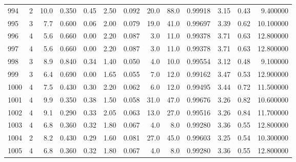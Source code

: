\begin{tabular}{lrrrrrrrrrrrr}
994  &        2 &           10.0 &             0.350 &         0.45 &            2.50 &      0.092 &                 20.0 &                  88.0 &  0.99918 &  3.15 &       0.43 &   9.400000 \\
995  &        3 &            7.7 &             0.600 &         0.06 &            2.00 &      0.079 &                 19.0 &                  41.0 &  0.99697 &  3.39 &       0.62 &  10.100000 \\
996  &        4 &            5.6 &             0.660 &         0.00 &            2.20 &      0.087 &                  3.0 &                  11.0 &  0.99378 &  3.71 &       0.63 &  12.800000 \\
997  &        4 &            5.6 &             0.660 &         0.00 &            2.20 &      0.087 &                  3.0 &                  11.0 &  0.99378 &  3.71 &       0.63 &  12.800000 \\
998  &        3 &            8.9 &             0.840 &         0.34 &            1.40 &      0.050 &                  4.0 &                  10.0 &  0.99554 &  3.12 &       0.48 &   9.100000 \\
999  &        3 &            6.4 &             0.690 &         0.00 &            1.65 &      0.055 &                  7.0 &                  12.0 &  0.99162 &  3.47 &       0.53 &  12.900000 \\
1000 &        4 &            7.5 &             0.430 &         0.30 &            2.20 &      0.062 &                  6.0 &                  12.0 &  0.99495 &  3.44 &       0.72 &  11.500000 \\
1001 &        4 &            9.9 &             0.350 &         0.38 &            1.50 &      0.058 &                 31.0 &                  47.0 &  0.99676 &  3.26 &       0.82 &  10.600000 \\
1002 &        4 &            9.1 &             0.290 &         0.33 &            2.05 &      0.063 &                 13.0 &                  27.0 &  0.99516 &  3.26 &       0.84 &  11.700000 \\
1003 &        4 &            6.8 &             0.360 &         0.32 &            1.80 &      0.067 &                  4.0 &                   8.0 &  0.99280 &  3.36 &       0.55 &  12.800000 \\
1004 &        2 &            8.2 &             0.430 &         0.29 &            1.60 &      0.081 &                 27.0 &                  45.0 &  0.99603 &  3.25 &       0.54 &  10.300000 \\
1005 &        4 &            6.8 &             0.360 &         0.32 &            1.80 &      0.067 &                  4.0 &                   8.0 &  0.99280 &  3.36 &       0.55 &  12.800000 \\

\end{tabular}
